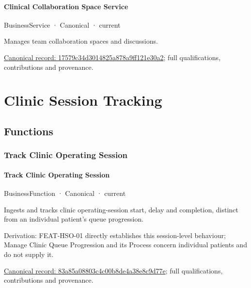 \paragraph{Clinical Collaboration Space Service}

\label{element:17579c34d3014825a878a9ff121e30a2}
{\small BusinessService · Canonical · current}\par

Manages team collaboration spaces and discussions.


{\footnotesize \href{../../../../continuum/business/business-service/17579c34d3014825a878a9ff121e30a2.md}{Canonical record: 17579c34d3014825a878a9ff121e30a2}; full qualifications, contributions and provenance.}\par
\section{Clinic Session Tracking}

\subsection{Functions}

\subsubsection{Track Clinic Operating Session}

\paragraph{Track Clinic Operating Session}

\label{element:83a85a08803c4c00b8de4a38e8c9d77e}
{\small BusinessFunction · Canonical · current}\par

Ingests and tracks clinic operating-session start, delay and completion, distinct from an individual patient's queue progression.



Derivation: FEAT-HSO-01 directly establishes this session-level behaviour; Manage Clinic Queue Progression and its Process concern individual patients and do not supply it.


{\footnotesize \href{../../../../continuum/business/business-function/83a85a08803c4c00b8de4a38e8c9d77e.md}{Canonical record: 83a85a08803c4c00b8de4a38e8c9d77e}; full qualifications, contributions and provenance.}\par

